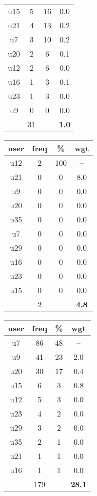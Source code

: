 \begin{appendices}
\begin{table}
\begin{tabular}{ |c|c|c|c| }
	u15 & 5 & 16 & 0.0 \\
	u21 & 4 & 13 & 0.2 \\
	u7 & 3 & 10 & 0.2 \\
	u20 & 2 & 6 & 0.1 \\
	u12 & 2 & 6 & 0.0 \\
	u16 & 1 & 3 & 0.1 \\
	u23 & 1 & 3 & 0.0 \\
	u9 & 0 & 0 & 0.0 \\
	 & 31 & & \textbf{1.0} \\
	\hline
\end{tabular}
\begin{tabular}{ |c|c|c|c| }
	\hline
	\textbf{user} & \textbf{freq} & \textbf{\%} & \textbf{wgt} \\
	\hline
	u12 & 2 & 100 & -- \\
	u21 & 0 & 0 & 8.0 \\
	u9 & 0 & 0 & 0.0 \\
	u20 & 0 & 0 & 0.0 \\
	u35 & 0 & 0 & 0.0 \\
	u7 & 0 & 0 & 0.0 \\
	u29 & 0 & 0 & 0.0 \\
	u16 & 0 & 0 & 0.0 \\
	u23 & 0 & 0 & 0.0 \\
	u15 & 0 & 0 & 0.0 \\
	 & 2 & & \textbf{4.8} \\
	\hline
\end{tabular}
\begin{tabular}{ |c|c|c|c| }
	\hline
	\textbf{user} & \textbf{freq} & \textbf{\%} & \textbf{wgt} \\
	\hline
	u7 & 86 & 48 & -- \\
	u9 & 41 & 23 & 2.0 \\
	u20 & 30 & 17 & 0.4 \\
	u15 & 6 & 3 & 0.8 \\
	u12 & 5 & 3 & 0.0 \\
	u23 & 4 & 2 & 0.0 \\
	u29 & 3 & 2 & 0.0 \\
	u35 & 2 & 1 & 0.0 \\
	u21 & 1 & 1 & 0.0 \\
	u16 & 1 & 1 & 0.0 \\
	 & 179 & & \textbf{28.1} \\
	\hline
\end{tabular}

\end{table}
\end{appendices}
